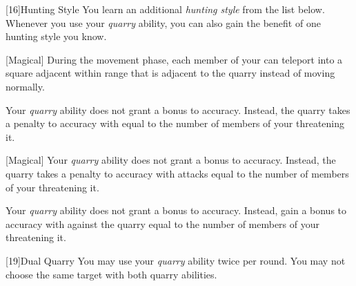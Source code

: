             [16]{Hunting Style}
            You learn an additional \textit{hunting style} from the list below.
            Whenever you use your \textit{quarry} ability, you can also gain the benefit of one hunting style you know.
            {
                [Magical]
                During the movement phase, each member of your  can teleport into a square adjacent within \rngmed range that is adjacent to the quarry instead of moving normally.

                Your \textit{quarry} ability does not grant a bonus to accuracy.
                Instead, the quarry takes a penalty to accuracy with  equal to the number of members of your  threatening it.

                [Magical]
                Your \textit{quarry} ability does not grant a bonus to accuracy.
                Instead, the quarry takes a penalty to accuracy with  attacks equal to the number of members of your  threatening it.

                Your \textit{quarry} ability does not grant a bonus to accuracy.
                Instead, gain a bonus to accuracy with  against the quarry equal to the number of members of your  threatening it.
            }

            [19]{Dual Quarry} You may use your \textit{quarry} ability twice per round.
            You may not choose the same target with both quarry abilities.

